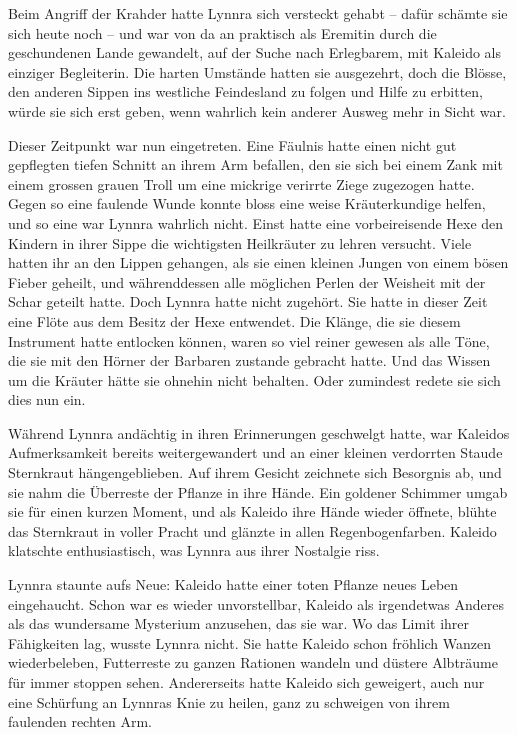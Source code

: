 \documentclass[10pt, a4paper, oneside]{book}
\begin{document}
Beim Angriff der Krahder hatte Lynnra sich versteckt gehabt – dafür schämte sie sich heute noch – und war von da an praktisch als Eremitin durch die geschundenen Lande gewandelt, auf der Suche nach Erlegbarem, mit Kaleido als einziger Begleiterin. Die harten Umstände hatten sie ausgezehrt, doch die Blösse, den anderen Sippen ins westliche Feindesland zu folgen und Hilfe zu erbitten, würde sie sich erst geben, wenn wahrlich kein anderer Ausweg mehr in Sicht war.



Dieser Zeitpunkt war nun eingetreten. Eine Fäulnis hatte einen nicht gut gepflegten tiefen Schnitt an ihrem Arm befallen, den sie sich bei einem Zank mit einem grossen grauen Troll um eine mickrige verirrte Ziege zugezogen hatte. Gegen so eine faulende Wunde konnte bloss eine weise Kräuterkundige helfen, und so eine war Lynnra wahrlich nicht. Einst hatte eine vorbeireisende Hexe den Kindern in ihrer Sippe die wichtigsten Heilkräuter zu lehren versucht. Viele hatten ihr an den Lippen gehangen, als sie einen kleinen Jungen von einem bösen Fieber geheilt, und währenddessen alle möglichen Perlen der Weisheit mit der Schar geteilt hatte. Doch Lynnra hatte nicht zugehört. Sie hatte in dieser Zeit eine Flöte aus dem Besitz der Hexe entwendet. Die Klänge, die sie diesem Instrument hatte entlocken können, waren so viel reiner gewesen als alle Töne, die sie mit den Hörner der Barbaren zustande gebracht hatte. Und das Wissen um die Kräuter hätte sie ohnehin nicht behalten. Oder zumindest redete sie sich dies nun ein.



Während Lynnra andächtig in ihren Erinnerungen geschwelgt hatte, war Kaleidos Aufmerksamkeit bereits weitergewandert und an einer kleinen verdorrten Staude Sternkraut hängengeblieben. Auf ihrem Gesicht zeichnete sich Besorgnis ab, und sie nahm die Überreste der Pflanze in ihre Hände. Ein goldener Schimmer umgab sie für einen kurzen Moment, und als Kaleido ihre Hände wieder öffnete, blühte das Sternkraut in voller Pracht und glänzte in allen Regenbogenfarben. Kaleido klatschte enthusiastisch, was Lynnra aus ihrer Nostalgie riss.



Lynnra staunte aufs Neue: Kaleido hatte einer toten Pflanze neues Leben eingehaucht. Schon war es wieder unvorstellbar, Kaleido als irgendetwas Anderes als das wundersame Mysterium anzusehen, das sie war. Wo das Limit ihrer Fähigkeiten lag, wusste Lynnra nicht. Sie hatte Kaleido schon fröhlich Wanzen wiederbeleben, Futterreste zu ganzen Rationen wandeln und düstere Albträume für immer stoppen sehen. Andererseits hatte Kaleido sich geweigert, auch nur eine Schürfung an Lynnras Knie zu heilen, ganz zu schweigen von ihrem faulenden rechten Arm.
\end{document}
